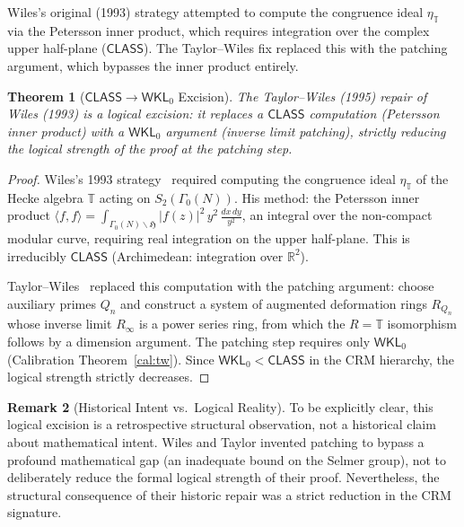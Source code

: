 \documentclass[11pt,a4paper]{article}
\theoremstyle{plain}
\newtheorem{theorem}{Theorem}[section]
\theoremstyle{definition}
\newtheorem{remark}[theorem]{Remark}
\newcommand{\WKL}{\textsf{WKL}_0}
\newcommand{\CLASS}{\textsf{CLASS}}
\newcommand{\R}{\mathbb{R}}
\begin{document}
Wiles's original (1993) strategy attempted to compute the congruence ideal $\eta_\mathbb{T}$ via the Petersson inner product, which requires integration over the complex upper half-plane ($\CLASS$). The Taylor--Wiles fix replaced this with the patching argument, which bypasses the inner product entirely. 

\begin{theorem}[$\CLASS \to \WKL$ Excision]\label{thm:excision}
The Taylor--Wiles (1995) repair of Wiles (1993) is a logical excision: it replaces a $\CLASS$ computation (Petersson inner product) with a $\WKL$ argument (inverse limit patching), strictly reducing the logical strength of the proof at the patching step.
\end{theorem}

\begin{proof}
Wiles's 1993 strategy~\cite{wiles95} required computing the congruence ideal $\eta_\mathbb{T}$ of the Hecke algebra $\mathbb{T}$ acting on $S_2(\Gamma_0(N))$. His method: the Petersson inner product $\langle f, f \rangle = \int_{\Gamma_0(N) \backslash \mathfrak{H}} |f(z)|^2 \, y^2 \, \frac{dx\,dy}{y^2}$, an integral over the non-compact modular curve, requiring real integration on the upper half-plane. This is irreducibly $\CLASS$ (Archimedean: integration over $\R^2$).

Taylor--Wiles~\cite{taylor-wiles95} replaced this computation with the patching argument: choose auxiliary primes $Q_n$ and construct a system of augmented deformation rings $R_{Q_n}$ whose inverse limit $R_\infty$ is a power series ring, from which the $R = \mathbb{T}$ isomorphism follows by a dimension argument. The patching step requires only $\WKL$ (Calibration Theorem~\ref{cal:tw}). Since $\WKL < \CLASS$ in the CRM hierarchy, the logical strength strictly decreases.
\end{proof}

\begin{remark}[Historical Intent vs.\ Logical Reality]\label{rem:wiles-intent}
To be explicitly clear, this logical excision is a retrospective structural observation, not a historical claim about mathematical intent. Wiles and Taylor invented patching to bypass a profound mathematical gap (an inadequate bound on the Selmer group), not to deliberately reduce the formal logical strength of their proof. Nevertheless, the structural consequence of their historic repair was a strict reduction in the CRM signature.
\end{remark}


\end{document}
